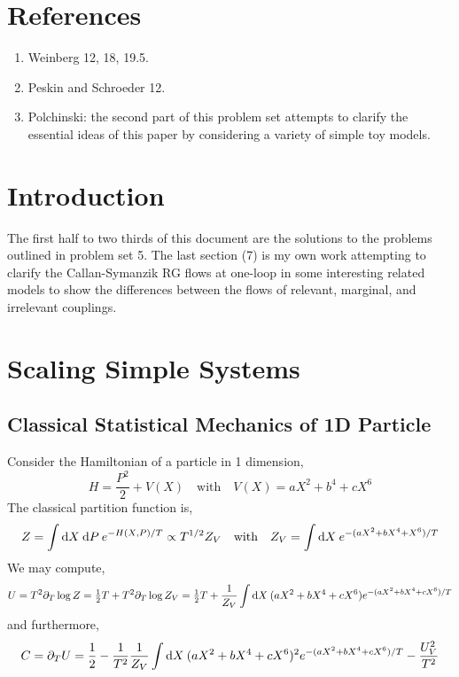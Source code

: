 \documentclass[12pt]{article}
\begin{document}
\newcommand{\Z}{\mathbb{Z}}

\tableofcontents
\newpage

\section{References}
\begin{enumerate}
\item Weinberg 12, 18, 19.5.
\item Peskin and Schroeder 12.
\item Polchinski: the second part of this problem set attempts to clarify the essential ideas of this paper by considering
a variety of simple toy models.
\end{enumerate}

\section{Introduction}

The first half to two thirds of this document are the solutions to the problems outlined in problem set 5. The last section (7) is my own work attempting to clarify the Callan-Symanzik RG flows at one-loop in some interesting related models to show the differences between the flows of relevant, marginal, and irrelevant couplings.

\section{Scaling Simple Systems}

\subsection{Classical Statistical Mechanics of 1D Particle}

Consider the Hamiltonian of a particle in 1 dimension,
\[ H = \frac{P^2}{2} + V(X) \quad \text{with} \quad V(X) = a X^2 + b^4 + c X^6 \]
The classical partition function is,
\begin{align*}
Z = \int \mathrm{d}X \: \mathrm{d}P \: e^{-H(X, P)/T} \propto T^{1/2} Z_V \quad \text{with} \quad Z_V = \int \mathrm{d}X \: e^{-(a X^2 + b X^4 + X^6)/T}  
\end{align*}
We may compute,
\begin{align*}
U = T^2 \partial_T \log{Z} = \tfrac{1}{2} T + T^2 \partial_T \log{Z_V} = \tfrac{1}{2} T + \frac{1}{Z_V} \int \mathrm{d}X \: (a X^2 + b X^4 + c X^6) e^{-(a X^2 + b X^4 + c X^6)/T}  
\end{align*}
and furthermore,
\begin{align*}
C = \partial_T U = \frac{1}{2} - \frac{1}{T^2} \frac{1}{Z_V} \int \mathrm{d}X \: (a X^2 + b X^4 + c X^6)^2 e^{-(a X^2 + b X^4 + c X^6)/T} - \frac{U_V^2}{T^2} 
\end{align*}
\end{document}
